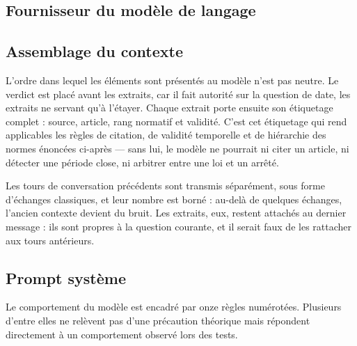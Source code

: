 \subsection{Fournisseur du modèle de langage}


\subsection{Assemblage du contexte}

L'ordre dans lequel les éléments sont présentés au modèle n'est pas neutre. Le
verdict est placé avant les extraits, car il fait autorité sur la question de
date, les extraits ne servant qu'à l'étayer. Chaque extrait porte ensuite son
étiquetage complet : source, article, rang normatif et validité. C'est cet
étiquetage qui rend applicables les règles de citation, de validité temporelle et
de hiérarchie des normes énoncées ci-après — sans lui, le modèle ne pourrait ni
citer un article, ni détecter une période close, ni arbitrer entre une loi et un
arrêté.

Les tours de conversation précédents sont transmis séparément, sous forme
d'échanges classiques, et leur nombre est borné : au-delà de quelques échanges,
l'ancien contexte devient du bruit. Les extraits, eux, restent attachés au
dernier message : ils sont propres à la question courante, et il serait faux de
les rattacher aux tours antérieurs.

\subsection{Prompt système}
\label{sec:prompt}

Le comportement du modèle est encadré par onze règles numérotées. Plusieurs
d'entre elles ne relèvent pas d'une précaution théorique mais répondent
directement à un comportement observé lors des tests.

